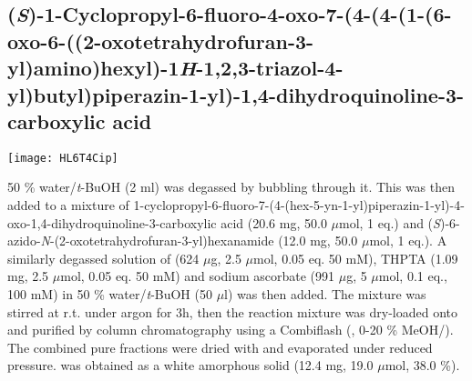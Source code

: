 {{{{{{{{{{{{{{{{{{\subsection{(\textit{S})-1-Cyclopropyl-6-fluoro-4-oxo-7-(4-(4-(1-(6-oxo-6-((2-oxotetrahydrofuran-3-yl)amino)hexyl)-1\textit{H}-1,2,3-triazol-4-yl)butyl)piperazin-1-yl)-1,4-dihydroquinoline-3-carboxylic acid }
	
\begin{scheme}[H]
	\begin{center}
		\texttt{[image: HL6T4Cip]}
	\end{center}
\end{scheme}

	
50 \% water/\textit{t}-BuOH (2 ml) was degassed by bubbling  through it. This was then added to a mixture of 1-cyclopropyl-6-fluoro-7-(4-(hex-5-yn-1-yl)piperazin-1-yl)-4-oxo-1,4\hyp{}dihydro\-quinoline-3-carboxylic acid  (20.6 mg, 50.0 $\mu$mol, 1 eq.) and (\textit{S})-6-azido-\textit{N}-(2-oxotetrahydrofuran-3-yl)hexanamide  (12.0 mg, 50.0 $\mu$mol, 1 eq.).
A similarly degassed solution of  (624 $\mu$g, 2.5 $\mu$mol, 0.05 eq. 50 mM), THPTA (1.09 mg, 2.5 $\mu$mol, 0.05 eq. 50 mM) and sodium ascorbate (991 $\mu$g, 5 $\mu$mol, 0.1 eq., 100 mM) in 50 \% water/\textit{t}-BuOH (50 $\mu$l) was then added. 
The mixture was stirred at r.t. under argon for 3h, then the reaction mixture was dry-loaded onto  and purified by column chromatography using a Combiflash (, 0-20 \% MeOH/). 
The combined pure fractions were dried with  and evaporated under reduced pressure.
 was obtained as a white amorphous solid (12.4 mg, 19.0 $\mu$mol, 38.0 \%).
\\[1\baselineskip]
\\[1\baselineskip]
\\[1\baselineskip]
}}}}}}}}}}}}}}}}}}
